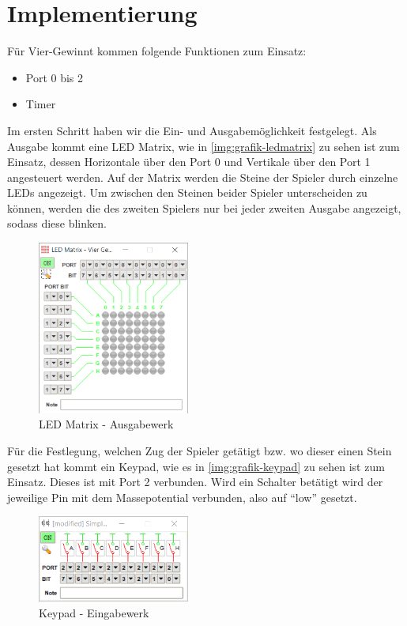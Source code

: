 \FloatBarrier
\chapter{Implementierung}
Für Vier-Gewinnt kommen folgende Funktionen zum Einsatz:
\begin{itemize}	
	\item Port 0 bis 2
	\item Timer
\end{itemize}

Im ersten Schritt haben wir die Ein- und Ausgabemöglichkeit festgelegt. Als Ausgabe kommt eine LED Matrix, wie in \autoref{img:grafik-ledmatrix} zu sehen ist zum Einsatz, dessen Horizontale über den Port 0 und Vertikale über den Port 1 angesteuert werden. Auf der Matrix werden die Steine der Spieler durch einzelne LEDs angezeigt.
Um zwischen den Steinen beider Spieler unterscheiden zu können, werden die des zweiten Spielers nur bei jeder zweiten Ausgabe angezeigt, sodass diese blinken.


\begin{figure}
	\centering
	\includegraphics[width=5cm]{ledmatrix.png}
	\caption{LED Matrix - Ausgabewerk}
	\label{img:grafik-ledmatrix}
\end{figure}

Für die Festlegung, welchen Zug der Spieler getätigt bzw. wo dieser einen Stein gesetzt hat kommt ein Keypad, wie es in \autoref{img:grafik-keypad} zu sehen ist zum Einsatz.
Dieses ist mit Port 2 verbunden. Wird ein Schalter betätigt wird der jeweilige Pin mit dem Massepotential verbunden, also auf \enquote{low} gesetzt.

\begin{figure}
	\centering
	\includegraphics[width=5cm]{keypad.png}
	\caption{Keypad - Eingabewerk}
	\label{img:grafik-keypad}
\end{figure}

